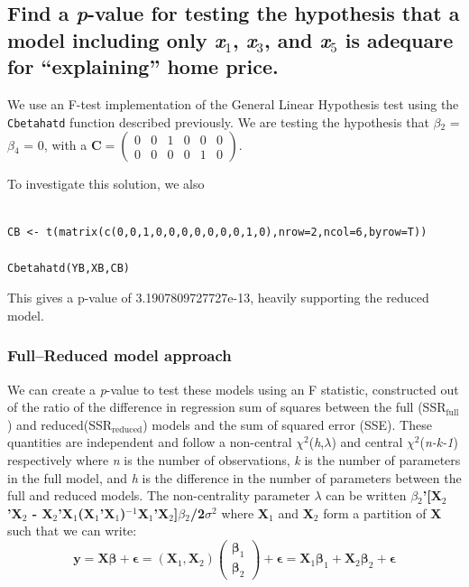 \documentclass[11pt]{article}
\begin{document}
{\subsection{Find a \emph{p}-value for testing the hypothesis that a model including only \emph{x$_1$}, \emph{x$_3$}, and \emph{x$_5$} is adequare for ``explaining'' home price.}
\label{sec-2-6}


 We use an F-test implementation of the General Linear Hypothesis
 test using the \verb~Cbetahatd~ function described previously. We are
 testing the hypothesis that $\beta$$_2$ = $\beta$$_4$ =
 0, with a $\mathbf{C} = \begin{pmatrix} 0 & 0 & 1 & 0 & 0 & 0\\ 0 & 0 & 0 & 0
 & 1 & 0\end{pmatrix}$.


To investigate this solution, we also 

\begin{verbatim}

CB <- t(matrix(c(0,0,1,0,0,0,0,0,0,0,1,0),nrow=2,ncol=6,byrow=T))

Cbetahatd(YB,XB,CB)
\end{verbatim}


 This gives a p-value of 3.1907809727727e-13, heavily supporting the
 reduced model.
\subsubsection{Full--Reduced model approach}
\label{sec-2-6-1}

We can create a \emph{p}-value to test these models using an F statistic,
constructed out of the ratio of the difference in regression sum of
squares between the full (SSR$_{\mathrm{full}}$) and reduced(SSR$_{\mathrm{reduced}}$) models and the sum of squared
error (SSE). These quantities are independent and follow a
non-central $\chi$$^2$(\emph{h},$\lambda$) and central $\chi$$^2$(\emph{n-k-1})
respectively where \emph{n} is the number of observations, \emph{k} is the
number of parameters in the full model, and \emph{h} is the difference in the
number of parameters between the full and reduced models. The
non-centrality parameter $\lambda$ can be written \textbf{$\beta$$_2$'[X$_2$'X$_2$ - X$_2$'X$_1$(X$_1$'X$_1$)$^{\mathrm{-1}}$X$_1$'X$_2$]$\beta$$_2$/2$\sigma$$^2$} where \textbf{X$_1$} and \textbf{X$_2$}
form a partition of \textbf{X} such that we can write: $$\mathbf{y} =
\mathbf{X\beta} + \mathbf{\epsilon} =
(\mathbf{X}_1,\mathbf{X}_2)\begin{pmatrix} \mathbf{\beta}_1
\\ \mathbf{\beta}_2 \end{pmatrix} + \mathbf{\epsilon} =
\mathbf{X}_1\mathbf{\beta}_1 + \mathbf{X}_2\mathbf{\beta}_2 +
\mathbf{\epsilon} $$

}
\end{document}
